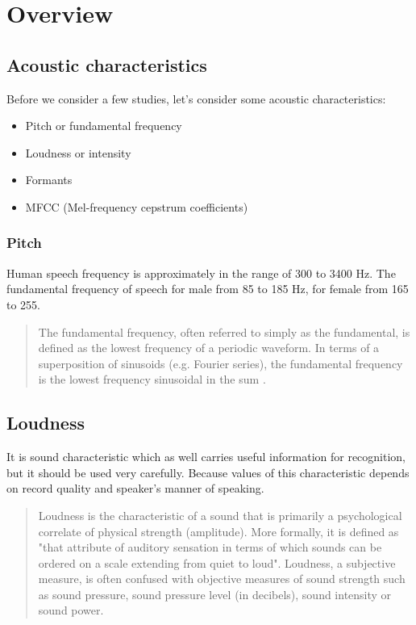 \documentclass[12pt, letterpaper]{article}
\begin{document}
\section{Overview}
\subsection{Acoustic characteristics}
Before we consider a few studies, let's consider some acoustic characteristics:
\begin{itemize}
	\item Pitch or fundamental frequency
	\item Loudness or intensity
	\item Formants
	\item MFCC (Mel-frequency cepstrum coefficients)
\end{itemize}

\subsubsection{Pitch}
Human speech frequency is approximately in the range of 300 to 3400 Hz. The fundamental frequency of speech for male from 85 to 185 Hz, for female from 165 to 255.
\begin{quote}
The fundamental frequency, often referred to simply as the fundamental, is defined as the lowest frequency of a periodic waveform. In terms of a superposition of sinusoids (e.g. Fourier series), the fundamental frequency is the lowest frequency sinusoidal in the sum \cite{wiki1}.
\end{quote}

\subsection{Loudness}
It is sound characteristic which as well carries useful information for recognition, but it should be used very carefully. Because values of this characteristic depends on record quality and speaker's manner of speaking.
\begin{quote}
Loudness is the characteristic of a sound that is primarily a psychological correlate of physical strength (amplitude). More formally, it is defined as "that attribute of auditory sensation in terms of which sounds can be ordered on a scale extending from quiet to loud".
Loudness, a subjective measure, is often confused with objective measures of sound strength such as sound pressure, sound pressure level (in decibels), sound intensity or sound power.\cite{wiki_loudness}
\end{quote}
\end{document}
